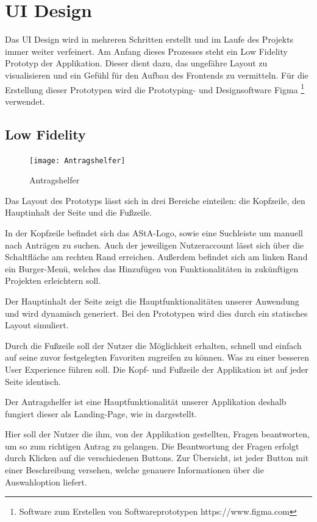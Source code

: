 \chapter{\ac{UI} Design}\label{ch:ui-design}
Das \ac{UI} Design wird in mehreren Schritten erstellt und im Laufe des Projekts immer weiter
verfeinert. Am Anfang dieses Prozesses steht ein Low Fidelity Prototyp der Applikation.
Dieser dient dazu, das ungefähre Layout zu visualisieren und ein Gefühl für den Aufbau
des Frontends zu vermitteln. %
Für die Erstellung dieser Prototypen wird die Prototyping- und
Designsoftware Figma \footnote{Software zum Erstellen von Softwareprototypen https://www.figma.com} verwendet.

\section{Low Fidelity}\label{Low Fidelity}
\begin{figure}[h]
  \centering
    \texttt{[image: Antragshelfer]}
    \caption{Antragshelfer}\label{Antragshelfer}
\end{figure}
Das Layout des Prototyps lässt sich in drei Bereiche einteilen:
die Kopfzeile, den Hauptinhalt der Seite und die Fußzeile.

In der Kopfzeile befindet sich das \ac{AStA}-Logo, sowie eine Suchleiste um manuell nach
Anträgen zu suchen.
Auch der jeweiligen Nutzeraccount lässt sich über die Schaltfläche
am rechten Rand erreichen.
Außerdem befindet sich am linken Rand ein Burger-Menü,
welches das Hinzufügen von Funktionalitäten in zukünftigen Projekten erleichtern soll.

Der Hauptinhalt der Seite zeigt die Hauptfunktionalitäten unserer Anwendung und wird 
dynamisch generiert. Bei den Prototypen wird dies
durch ein statisches Layout simuliert.

Durch die Fußzeile soll der Nutzer die Möglichkeit erhalten, schnell und einfach auf
seine zuvor festgelegten Favoriten zugreifen zu können.
Was zu einer besseren User Experience führen soll.
Die Kopf- und Fußzeile der Applikation ist auf jeder Seite identisch.

Der Antragshelfer ist eine Hauptfunktionalität unserer Applikation deshalb fungiert
dieser als Landing-Page, wie in  dargestellt.

Hier soll der Nutzer die ihm, von der Applikation gestellten, Fragen beantworten,
um so zum richtigen Antrag zu gelangen. %
Die Beantwortung der Fragen erfolgt durch Klicken auf die verschiedenen Buttons. %
Zur Übersicht, ist jeder Button mit einer Beschreibung versehen, welche genauere Informationen über die Auswahloption liefert.

